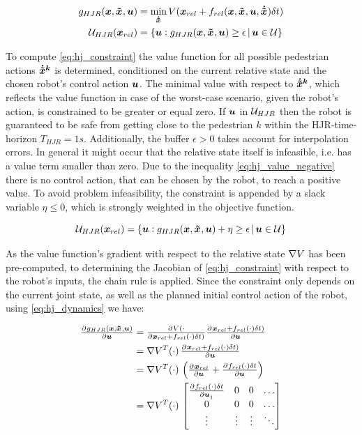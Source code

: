 \begin{align}
g_{HJR}(\x, \xped[], \u) &= \min_{\dxped[]} \Vrel(\xrel + \frel(\x, \xped[], \u, \dxped[]) \dt) \\
\uset_{HJR} (\xrel) &= \{ \u: g_{HJR}(\x, \xped[], \u) \geq \epsilon  \, | \, \u \in \uset \} 
\label{eq:hj_constraint}
\end{align}

To compute \ref{eq:hj_constraint} the value function for all possible pedestrian actions $\dxped[k]$ is determined, conditioned on the current relative state and the chosen robot's control action $\boldsymbol{u}$. The minimal value with respect to $\dxped[k]$, which reflects the value function in case of the worst-case scenario, given the robot's action, is constrained to be greater or equal zero. If $\boldsymbol{u}$ in $\mathcal{U}_{HJR}$ then the robot is guaranteed to be safe from getting close to the pedestrian $k$ within the \ac{HJR}-time-horizon $T_{HJR} = 1s$. Additionally, the buffer $\epsilon > 0$ takes account for interpolation errors. 
\newline
In general it might occur that the relative state itself is infeasible, i.e. has a value term smaller than zero. Due to the inequality \ref{eq:hj_value_negative} there is no control action, that can be chosen by the robot, to reach a positive value. To avoid problem infeasibility, the constraint is appended by a slack variable $\eta \leq 0$, which is strongly weighted in the objective function. 

\begin{equation}
\uset_{HJR} (\xrel) = \{ \u: g_{HJR}(\x, \xped[], \u) + \eta \geq \epsilon  \, | \, \u \in \uset \}
\end{equation}

As the value function's gradient with respect to the relative state $\nabla V$ has been pre-computed, to determining the Jacobian of \ref{eq:hj_constraint} with respect to the robot's inputs, the chain rule is applied. Since the constraint only depends on the current joint state, as well as the planned initial control action of the robot, using \ref{eq:hj_dynamics} we have:

\begin{align}
\pd{g_{HJR}(\x, \xped[], \u)}{\u} &= \pd{\Vrel(\cdot}{\xrel + \frel(\cdot) \dt)} \pd{\xrel + \frel(\cdot) \dt)}{\u} \\ 
&= \nabla \Vrel^T(\cdot) \, \pd{\xrel + \frel(\cdot) \dt)}{\u} \\
&= \nabla \Vrel^T(\cdot) \, \left( \pd{\xrel}{\u} + \pd{\frel(\cdot) \dt}{\u} \right) \\ 
&= \nabla \Vrel^T(\cdot) \, \begin{bmatrix} 
\pd{\frel(\cdot) \dt}{\u_1} & 0 & 0 & \hdots \\ 
0 & 0 & 0 & \hdots \\ 
\vdots & \vdots & \vdots & \ddots \\ 
\end{bmatrix}
\end{align}


